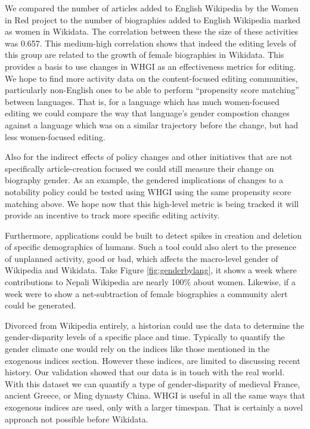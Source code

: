 \documentclass{sig-alternate-05-2015}
\begin{document}
We compared the number of articles added to English Wikipedia by the Women in Red project to the number of biographies added to English Wikipedia marked as women in Wikidata. The correlation between these the size of these activities was	 0.657. This medium-high correlation shows that indeed the editing levels of this group are related to the growth of female biographies in Wikidata. This provides a basis to use changes in WHGI as an effectiveness metrics for editing. We hope to find more activity data on the content-focused editing communities, particularly non-English ones to be able to perform ``propensity score matching'' between languages. That is, for a language which has much women-focused editing we could compare the way that language's gender compostion changes against a language which was on a similar trajectory before the change, but had less women-focused editing.

Also for the indirect effects of policy changes and other initiatives that are not specifically article-creation focused we could still measure their change on biography gender. As an example, the gendered implications of changes to a notability policy could be tested using WHGI using the same propensity score matching above. We hope now that this high-level metric is being tracked it will provide an incentive to track more specific editing activity.

Furthermore, applications could be built to detect spikes in creation and deletion of specific demographics of humans. Such a tool could also alert to the presence of unplanned activity, good or bad, which affects the macro-level gender of Wikipedia and Wikidata. Take Figure \ref{fig:genderbylang}, it shows a week where contributions to Nepali Wikipedia are nearly 100\% about women. Likewise, if a week were to show a net-subtraction of female biographies  a community alert could be generated. 

Divorced from Wikipedia entirely, a historian could use the data to determine the gender-disparity levels of a specific place and time. Typically to quantify the gender climate one would rely on the indices like those mentioned in the exogenous indices section. However these indices, are limited to discussing recent history. Our validation showed that our data is in touch with the real world. With this dataset we can quantify a type of gender-disparity of medieval France, ancient Greece, or Ming dynasty China. WHGI is useful in all the same ways that exogenous indices are used, only with a larger timespan. That is certainly a novel approach not possible before Wikidata.
\end{document}
